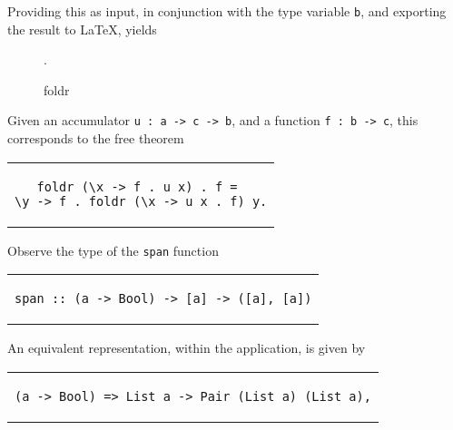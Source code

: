 \documentclass[../Dissertation.tex]{subfiles}
\begin{document}
Providing this as input, in conjunction with the type variable \lstinline{b}, and exporting the result to LaTeX, yields
\begin{figure}[H]
  \begin{center}
    .
  \end{center}
  \caption{foldr}
  \label{fig:petrifoldr}
\end{figure}
\noindent
Given an accumulator \lstinline{u : a -> c -> b}, and a function \lstinline{f : b -> c}, this corresponds to the free theorem
\begin{center}
\begin{tabular}{c}
\begin{lstlisting}[basicstyle=\ttfamily,style=haskellStyle]
foldr (\x -> f . u x) . f = 
\y -> f . foldr (\x -> u x . f) y.
\end{lstlisting}
\end{tabular}
\end{center}
Observe the type of the \lstinline{span} function
\begin{center}
\begin{tabular}{c}
\begin{lstlisting}
span :: (a -> Bool) -> [a] -> ([a], [a])
\end{lstlisting}
\end{tabular}
\end{center}
An equivalent representation, within the application, is given by
\begin{center}
\begin{tabular}{c}
\begin{lstlisting}
(a -> Bool) => List a -> Pair (List a) (List a),
\end{lstlisting}
\end{tabular}
\end{center}
\end{document}
